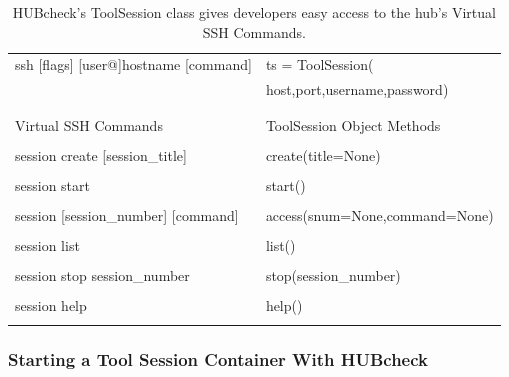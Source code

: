 \begin{table}
  \centering
  \caption{HUBcheck's ToolSession class gives developers easy access to the
           hub's Virtual SSH Commands.}
  \begin{tabular}{ l | l }
    \hline
    ssh [flags] [user@]hostname [command] & ts = ToolSession( \\
                                          &   host,port,username,password) \\
                                          &                       \\
                                          &                       \\ \hline
    Virtual SSH Commands                  & ToolSession Object Methods \\ \hline
                                          &                       \\
    session create [session\_title]       & create(title=None)    \\
                                          &                       \\
    session start                         & start()               \\
                                          &                       \\
    session [session\_number] [command]   & access(snum=None,command=None) \\
                                          &                       \\
    session list                          & list()                \\
                                          &                       \\
    session stop session\_number          & stop(session\_number) \\
                                          &                       \\
    session help                          & help()                \\
                                          &                       \\
    \hline
  \end{tabular}
  \label{tab:virtualSSHToolSession}
\end{table}


\subsubsection{Starting a Tool Session Container With HUBcheck}
\label{ssec:hubcheck_shell_modules_starting_container}

